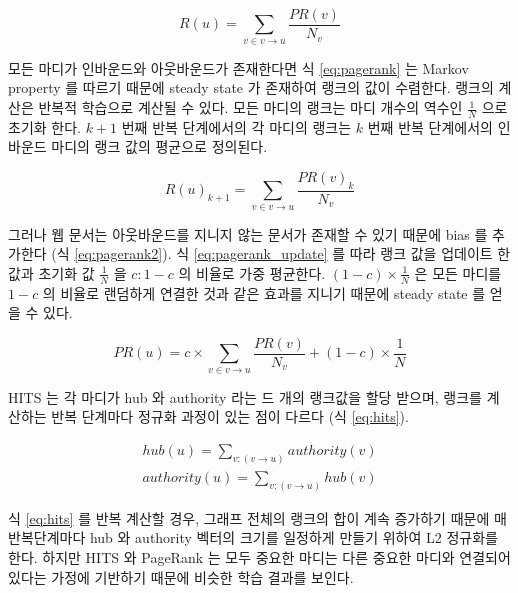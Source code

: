 \documentclass[11pt]{article}
\begin{document}
\begin{equation}
  \label{eq:pagerank}
  R(u) = \sum_{v \in v \rightarrow u} \frac{PR(v)}{N_v}
\end{equation}

모든 마디가 인바운드와 아웃바운드가 존재한다면 식 \ref{eq:pagerank} 는 Markov property 를 따르기 때문에 steady state 가 존재하여 랭크의 값이 수렴한다.
랭크의 계산은 반복적 학습으로 계산될 수 있다.
모든 마디의 랭크는 마디 개수의 역수인 $\frac{1}{N}$ 으로 초기화 한다.
$k+1$ 번째 반복 단계에서의 각 마디의 랭크는 $k$ 번째 반복 단계에서의 인바운드 마디의 랭크 값의 평균으로 정의된다.

\begin{equation}
  \label{eq:pagerank_update}
  R(u)_{k+1} = \sum_{v \in v \rightarrow u} \frac{PR(v)_k}{N_v}
\end{equation}

그러나 웹 문서는 아웃바운드를 지니지 않는 문서가 존재할 수 있기 때문에 bias 를 추가한다 (식 \ref{eq:pagerank2}).
식 \ref{eq:pagerank_update} 를 따라 랭크 값을 업데이트 한 값과 초기화 값 $\frac{1}{N}$ 을 $c : 1-c$ 의 비율로 가중 평균한다.
$(1-c) \times \frac{1}{N}$ 은 모든 마디를 $1-c$ 의 비율로 랜덤하게 연결한 것과 같은 효과를 지니기 때문에 steady state 를 얻을 수 있다.

\begin{equation}
  \label{eq:pagerank2}
  PR(u) = c \times \sum_{v \in v \rightarrow u} \frac{PR(v)}{N_v} + (1-c) \times \frac{1}{N}
\end{equation}

HITS 는 각 마디가 hub 와 authority 라는 드 개의 랭크값을 할당 받으며, 랭크를 계산하는 반복 단계마다 정규화 과정이 있는 점이 다르다 (식 \ref{eq:hits}).

\begin{equation}
  \label{eq:hits}
  \begin{aligned}
  hub(u) = \sum_{v:(v \rightarrow u)} authority(v) \\
  authority(u) = \sum_{v:(v \rightarrow u)} hub(v)
  \end{aligned}
\end{equation}

식 \ref{eq:hits} 를 반복 계산할 경우, 그래프 전체의 랭크의 합이 계속 증가하기 때문에 매 반복단계마다 hub 와 authority 벡터의 크기를 일정하게 만들기 위하여 L2 정규화를 한다.
하지만 HITS 와 PageRank 는 모두 중요한 마디는 다른 중요한 마디와 연결되어 있다는 가정에 기반하기 때문에 비슷한 학습 결과를 보인다.
\end{document}
